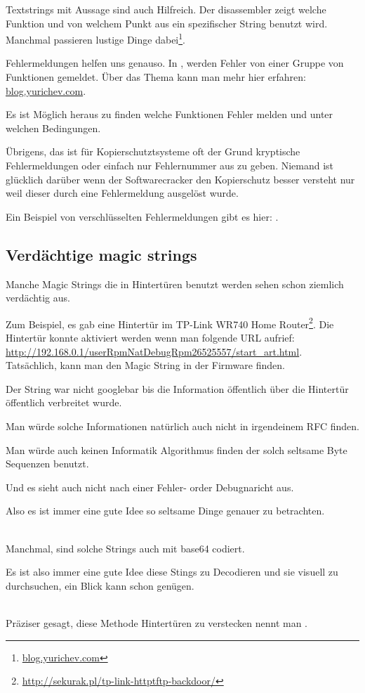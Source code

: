 Textstrings mit Aussage sind auch Hilfreich.
Der \IDA disassembler zeigt welche Funktion und von welchem Punkt aus ein spezifischer String benutzt wird.
Manchmal passieren lustige Dinge dabei\footnote{\href{http://go.yurichev.com/17223}{blog.yurichev.com}}.

Fehlermeldungen helfen uns genauso.
In \oracle, werden Fehler von einer Gruppe von Funktionen gemeldet.
\"Uber das Thema kann man mehr hier erfahren: \href{http://go.yurichev.com/17224}{blog.yurichev.com}.


Es ist M\"oglich heraus zu finden welche Funktionen Fehler melden und unter welchen Bedingungen.


\"Ubrigens, das ist f\"ur Kopierschutztsysteme oft der Grund kryptische Fehlermeldungen oder einfach nur 
Fehlernummer aus zu geben. Niemand ist gl\"ucklich dar\"uber wenn der Softwarecracker den Kopierschutz besser
versteht nur weil dieser durch eine Fehlermeldung ausgel\"ost wurde.

Ein Beispiel von verschl\"usselten Fehlermeldungen gibt es hier: .

\subsection{Verd\"achtige magic strings}

Manche Magic Strings die in Hintert\"uren benutzt werden sehen schon ziemlich verd\"achtig aus.

Zum Beispiel, es gab eine Hintert\"ur im TP-Link WR740 Home Router\footnote{\url{http://sekurak.pl/tp-link-httptftp-backdoor/}}.
Die Hintert\"ur konnte aktiviert werden wenn man folgende URL aufrief:
\url{http://192.168.0.1/userRpmNatDebugRpm26525557/start_art.html}.\\

Tats\"achlich, kann man den Magic String  in der Firmware finden.

Der String war nicht googlebar bis die Information \"offentlich \"uber die Hintert\"ur \"offentlich verbreitet wurde.


Man w\"urde solche Informationen nat\"urlich auch nicht in irgendeinem \ac{RFC} finden.


Man w\"urde auch keinen Informatik Algorithmus finden der solch seltsame Byte Sequenzen benutzt.


Und es sieht auch nicht nach einer Fehler- order Debugnaricht aus.


Also es ist immer eine gute Idee so seltsame Dinge genauer zu betrachten.\\
\\

Manchmal, sind solche Strings auch mit base64 codiert.

Es ist also immer eine gute Idee diese Stings zu Decodieren und sie visuell zu durchsuchen, ein Blick
kann schon gen\"ugen.

\\
Pr\"aziser gesagt, diese Methode Hintert\"uren zu verstecken nennt man .

